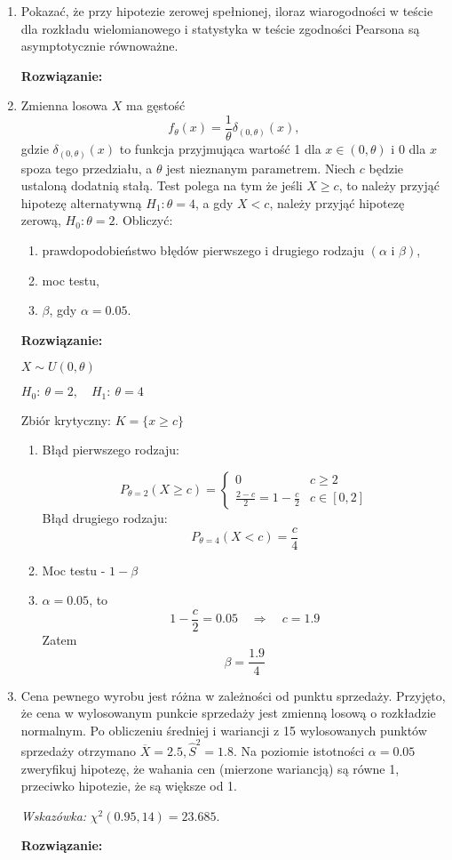 \documentclass[11pt]{article}
\begin{document}
\begin{enumerate}
    \item Pokazać, że przy hipotezie zerowej spełnionej, iloraz wiarogodności w teście dla rozkładu wielomianowego i statystyka w teście zgodności Pearsona są asymptotycznie równoważne.
    \par 
    \textbf{Rozwiązanie: }
    \item Zmienna losowa \(X\) ma gęstość 
    \[f_{\theta}(x) = \frac{1}{\theta} \delta_{(0, \theta)} (x), \]
    gdzie \(\delta_{(0, \theta)} (x)\) to funkcja przyjmująca wartość 1 dla \(x \in (0, \theta)\) i 0 dla \(x\) spoza tego przedziału, a \(\theta\) jest nieznanym parametrem. Niech \(c\) będzie ustaloną dodatnią stałą. Test polega na tym że jeśli \(X \geq c\), to należy przyjąć hipotezę alternatywną \(H_1: \theta = 4\), a gdy \(X < c\), należy przyjąć hipotezę zerową, \(H_0: \theta=2\). Obliczyć:
    \begin{enumerate}
        \item prawdopodobieństwo błędów pierwszego i drugiego rodzaju \((\alpha \text{ i } \beta)\),
        \item moc testu, 
        \item \(\beta\), gdy \(\alpha = 0.05\).
    \end{enumerate}
    \textbf{Rozwiązanie: }
    \par 
    \(X \sim U(0, \theta)\)
    \par 
    \(H_0: \: \theta = 2, \quad H_1: \: \theta =4\)
    \par 
    Zbiór krytyczny: \(K = \{x \geq c\}\)
    \begin{enumerate}
        \item Błąd pierwszego rodzaju:
        \par 
        \[P_{\theta=2} (X\geq c) = \begin{cases} 0 & c\geq 2 \\
        \frac{2-c}{2} = 1 - \frac{c}{2} & c \in [0, 2]\end{cases}\]
        Błąd drugiego rodzaju: 
        \[P_{\theta = 4} (X< c) = \frac{c}{4}\]
        \item Moc testu - \(1-\beta\)
        \item \(\alpha = 0.05\), to 
        \[1 - \frac{c}{2} = 0.05 \quad \Rightarrow \quad c= 1.9\]
        Zatem 
        \[\beta = \frac{1.9}{4}\]
    \end{enumerate}
    \item Cena pewnego wyrobu jest różna w zależności od punktu sprzedaży. Przyjęto, że cena w wylosowanym punkcie sprzedaży jest zmienną losową o rozkładzie normalnym. Po obliczeniu średniej i wariancji z 15 wylosowanych punktów sprzedaży otrzymano \(\overline{X} = 2.5, \hat{S}^2 = 1.8\). Na poziomie istotności \(\alpha = 0.05\) zweryfikuj hipotezę, że wahania cen (mierzone wariancją) są równe 1, przeciwko hipotezie, że są większe od 1.
    \par 
    \textit{Wskazówka: } \(\chi^2(0.95, 14) = 23.685\). 
    \par 
    \textbf{Rozwiązanie: }
    

\end{enumerate}
\end{document}
